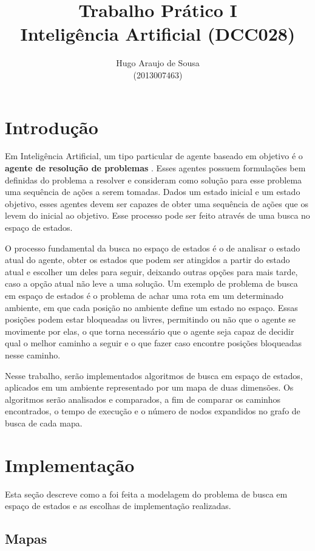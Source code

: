 \documentclass[12pt]{article}
\title{Trabalho Prático I \\ Inteligência Artificial (DCC028)}
\author{Hugo Araujo de Sousa \\ (2013007463)}
\begin{document}
 

\maketitle

\section{Introdução}

Em Inteligência Artificial, um tipo particular de agente baseado em objetivo é o \textbf{agente de resolução de problemas} \cite{russell2016artificial}. Esses agentes possuem formulações bem definidas do problema a resolver e consideram como solução para esse problema uma sequência de ações a serem tomadas. Dados um estado inicial e um estado objetivo, esses agentes devem ser capazes de obter uma sequência de ações que os levem do inicial ao objetivo. Esse processo pode ser feito através de uma busca no espaço de estados.

O processo fundamental da busca no espaço de estados é o de analisar o estado atual do agente, obter os estados que podem ser atingidos a partir do estado atual e escolher um deles para seguir, deixando outras opções para mais tarde, caso a opção atual não leve a uma solução. Um exemplo de problema de busca em espaço de estados é o problema de achar uma rota em um determinado ambiente, em que cada posição no ambiente define um estado no espaço. Essas posições podem estar bloqueadas ou livres, permitindo ou não que o agente se movimente por elas, o que torna necessário que o agente seja capaz de decidir qual o melhor caminho a seguir e o que fazer caso encontre posições bloqueadas nesse caminho.

Nesse trabalho, serão implementados algoritmos de busca em espaço de estados, aplicados em um ambiente representado por um mapa de duas dimensões. Os algoritmos serão analisados e comparados, a fim de comparar os caminhos encontrados, o tempo de execução e o número de nodos expandidos no grafo de busca de cada mapa.

\section{Implementação}

Esta seção descreve como a foi feita a modelagem do problema de busca em espaço de estados e as escolhas de implementação realizadas.

\subsection{Mapas}
\end{document}
